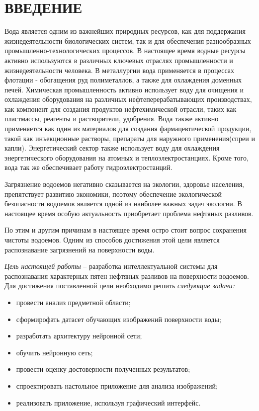 \section*{ВВЕДЕНИЕ}

Вода является одним из важнейших природных ресурсов, как для поддержания жизнедеятельности биологических систем, так и для обеспечения разнообразных промышленно-технологических процессов. В настоящее время водные ресурсы активно используются в различных ключевых отраслях промышленности и жизнедеятельности человека. В металлургии вода применяется в процессах флотации - обогащения руд полиметаллов, а также для охлаждения доменных печей. Химическая промышленность активно использует воду  для очищения и охлаждения оборудования на различных нефтеперерабатывающих производствах, как компонент для создания продуктов нефтехимической отрасли, таких как пластмассы, реагенты и растворители, удобрения. Вода также активно применяется как один из материалов для создания фармацевтической продукции, такой как инъекционные растворы, препараты для наружного применения(спреи и капли).  Энергетический сектор также использует воду для охлаждения энергетического оборудования на атомных и теплоэлектростанциях. Кроме того, вода так же обеспечивает работу гидроэлектростанций. 

Загрязнение водоемов негативно сказывается на экологии, здоровье населения, препятствует развитию экономики, поэтому обеспечение экологической безопасности водоемов является одной из наиболее важных задач экологии. В настоящее время особую актуальность приобретает проблема нефтяных разливов.

По этим и другим причинам в настоящее время остро стоит вопрос сохранения чистоты водоемов. Одним из способов достижения этой цели является распознавание загрязнений на поверхности воды.

\emph{Цель настоящей работы} – разработка интеллектуальной системы для распознавания характерных пятен нефтяных разливов на поверхности водоемов. Для достижения поставленной цели необходимо решить \emph{следующие задачи:}
\begin{itemize}
\item провести анализ предметной области;
\item сформирофать датасет обучающих изображений поверхности воды;
\item разработать архитектуру нейронной сети;
\item обучить нейронную сеть;
\item провести оценку достоверности полученных результатов;
\item спроектировать настольное приложение для анализа изображений;
\item реализовать приложение, используя графический интерфейс.
\end{itemize}

